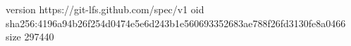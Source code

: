version https://git-lfs.github.com/spec/v1
oid sha256:4196a94b26f254d0474e5e6d243b1e560693352683ae788f26fd3130fe8a0466
size 297440
